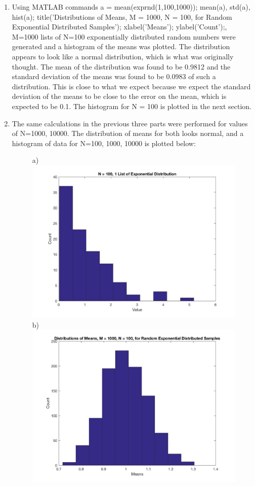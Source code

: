 \documentclass{article}
\begin{document}
\begin{enumerate}
            \item Using MATLAB commands a = mean(exprnd(1,100,1000)); mean(a), std(a), hist(a); title('Distributions of Means, M = 1000, N = 100, for Random Exponential Distributed Samples'); xlabel('Means'); ylabel('Count');, M=1000 lists of N=100 exponentially distributed random numbers were generated and a histogram of the means was plotted. The distribution appears to look like a normal distribution, which is what was originally thought.  The mean of the distribution was found to be 0.9812 and the standard deviation of the means was found to be 0.0983 of such a distribution. This is close to what we expect because we expect the standard deviation of the means to be close to the error on the mean, which is expected to be 0.1. The histogram for N = 100 is plotted in the next section.
            \item The same calculations in the previous three parts were performed for values of N=1000, 10000. The distribution of means for both looks normal, and a histogram of data for N=100, 1000, 10000 is plotted below:
            \begin{figure}[H]
    \centering
    a)\includegraphics[scale = 0.2]{4a.jpg}
    b)\includegraphics[scale = 0.2]{4b.jpg}

\end{figure}
\end{enumerate}
\end{document}
